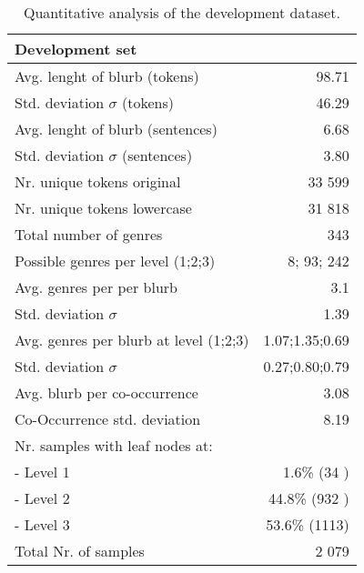 \documentclass[11pt,a4paper]{article}
\begin{document}
\begin{table}
\small
\begin{center}
\begin{tabular}{|l|r|}
\hline\centering\textbf{Development set}  &             \\
\hline
Avg. lenght of blurb (tokens)              &   98.71        \\
Std. deviation $\sigma$ (tokens)           &   46.29        \\
Avg. lenght of blurb (sentences)           &   6.68         \\
Std. deviation $\sigma$ (sentences)        &   3.80         \\
\hline
Nr. unique tokens original                 &  33 599        \\
Nr. unique tokens lowercase                &  31 818        \\
\hline
Total number of genres                     &   343             \\
Possible genres per level (1;2;3)          &   8; 93; 242      \\
Avg. genres per per blurb                  &   3.1             \\
Std. deviation $\sigma$                    &   1.39            \\
Avg. genres per blurb at level (1;2;3)     &   1.07;1.35;0.69  \\
Std. deviation $\sigma$                    &   0.27;0.80;0.79  \\
\hline
Avg. blurb per co-occurrence               &   3.08            \\
Co-Occurrence std. deviation               &   8.19            \\
\hline
Nr. samples with leaf nodes at:            &                   \\
 - Level 1                                 &  1.6\% (34 )      \\
 - Level 2                                 &  44.8\% (932 )    \\
 - Level 3                                 &  53.6\% (1113)    \\
\hline
Total Nr. of samples                       &  2 079            \\
\hline
\end{tabular}
\end{center}
\caption{\label{quantitivy-analysis-dev}Quantitative analysis of the development dataset.}
\end{table}
\end{document}

